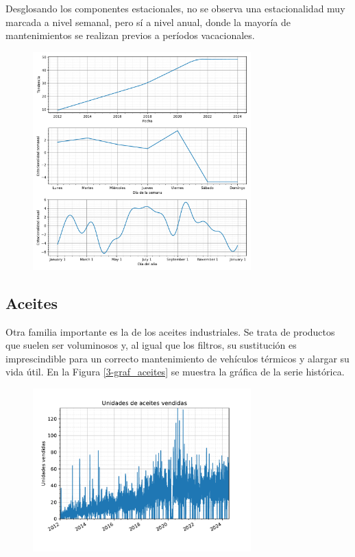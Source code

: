 Desglosando los componentes estacionales, no se observa una estacionalidad muy marcada a nivel semanal, pero sí a nivel anual, donde la mayoría de mantenimientos se realizan previos a períodos vacacionales.

\begin{figure}[H]
	{\includegraphics[width=0.75\textwidth]{imagenes/comps_filtros.pdf}}
\end{figure}

\subsection{Aceites}

Otra familia importante es la de los aceites industriales. Se trata de productos que suelen ser voluminosos y, al igual que los filtros, su sustitución es imprescindible para un correcto mantenimiento de vehículos térmicos y alargar su vida útil. En la Figura \ref*{3-graf_aceites} se muestra la gráfica de la serie histórica.

\begin{figure}[H]
	{\includegraphics[width=0.75\textwidth]{imagenes/grafica_aceites.pdf}}
\end{figure}

